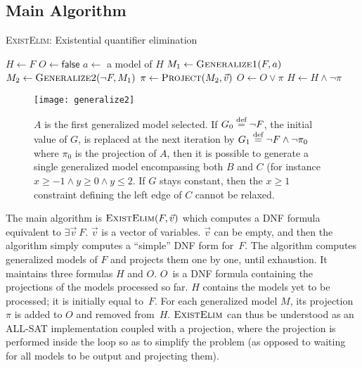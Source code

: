 \subsection{Main Algorithm}
\begin{algorithm}
\caption{\textsc{ExistElim}: Existential quantifier elimination}

\begin{algorithmic}
\STATE $H \gets F$
\STATE $O \gets \textsf{false}$
  \STATE $a \gets$ a model of $H$ 
  \STATE $M_1 \gets \textsc{Generalize1}(F, a)$ 
  \STATE $M_2 \gets \textsc{Generalize2}(\neg F, M_1)$ 
  \STATE $\pi \gets \textsc{Project}(M_2, \vec{v})$
  \STATE $O \gets O \vee \pi$
  \STATE $H \gets H \wedge \neg \pi$
\ENDWHILE
{}
\end{algorithmic}
\end{algorithm}
\begin{figure}
\begin{center}
\texttt{[image: generalize2]}
\end{center}
\caption{$A$ is the first generalized model selected. If $G_0 \stackrel{\text{def}}{=} \neg F$, the initial value of $G$, is replaced at the next iteration by $G_1 \stackrel{\text{def}}{=} \neg F \wedge \neg \pi_0$ where $\pi_0$ is the projection of $A$, then it is possible to generate a single generalized model encompassing both $B$ and $C$ (for instance $x \geq -1 \allowbreak\wedge\allowbreak y \geq 0 \allowbreak\wedge\allowbreak y \leq 2$. If $G$ stays constant, then the $x \geq 1$ constraint defining the left edge of $C$ cannot be relaxed.}
\label{fig:generalize2}
\end{figure}

The main algorithm is $\textsc{ExistElim}(F, \vec{v})$ which computes a DNF formula equivalent to $\exists \vec{v}~F$. $\vec{v}$ is a vector of variables. $\vec{v}$ can be empty, and then the algorithm simply computes a ``simple'' DNF form for~$F$. The algorithm computes generalized models of $F$ and projects them one by one, until exhaustion. It maintains three formulas $H$ and $O$. $O$~is a DNF formula containing the projections of the models processed so far. $H$ contains the models yet to be processed; it is initially equal to~$F$. For each generalized model $M$, its projection $\pi$ is added to $O$ and removed from~$H$.
$\textsc{ExistElim}$ can thus be understood as an ALL-SAT implementation coupled with a projection, where the projection is performed inside the loop so as to simplify the problem (as opposed to waiting for all models to be output and projecting them).


